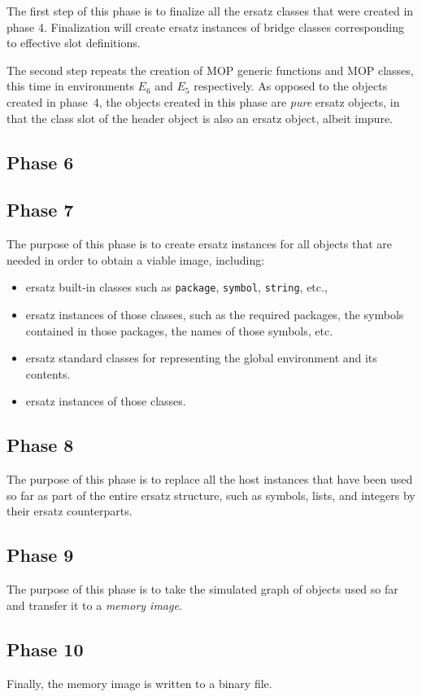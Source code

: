 The first step of this phase is to finalize all the ersatz classes
that were created in phase 4.  Finalization will create ersatz
instances of bridge classes corresponding to effective slot
definitions.

The second step repeats the creation of MOP generic functions and MOP
classes, this time in environments $E_6$ and $E_5$ respectively.  As
opposed to the objects created in phase~4, the objects created in this
phase are \emph{pure} ersatz objects, in that the class slot of the
header object is also an ersatz object, albeit impure.

\subsection{Phase 6}

\subsection{Phase 7}

The purpose of this phase is to create ersatz instances for all
objects that are needed in order to obtain a viable image, including:

\begin{itemize}
\item ersatz built-in classes such as \texttt{package}, \texttt{symbol},
  \texttt{string}, etc.,
\item ersatz instances of those classes, such as the required
  packages, the symbols contained in those packages, the names of
  those symbols, etc.
\item ersatz standard classes for representing the global environment
  and its contents.
\item ersatz instances of those classes.
\end{itemize}

\subsection{Phase 8}

The purpose of this phase is to replace all the host instances that
have been used so far as part of the entire ersatz structure, such as
symbols, lists, and integers by their ersatz counterparts.

\subsection{Phase 9}

The purpose of this phase is to take the simulated graph of objects
used so far and transfer it to a \emph{memory image}. 

\subsection{Phase 10}

Finally, the memory image is written to a binary file.


